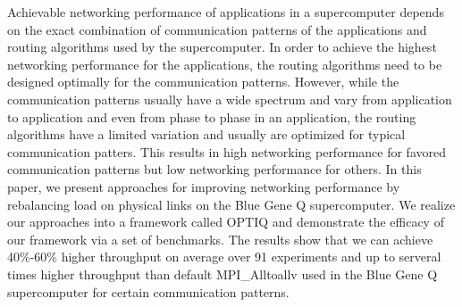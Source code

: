 Achievable networking performance of applications in a supercomputer depends on the exact combination of communication patterns of the applications and routing algorithms used by the supercomputer. In order to achieve the highest networking performance for the applications, the routing algorithms need to be designed optimally for the communication patterns. However, while the communication patterns usually have a wide spectrum and vary from application to application and even from phase to phase in an application, the routing algorithms have a limited variation and usually are optimized for typical communication patters. This results in high networking performance for favored communication patterns but low networking performance for others. In this paper, we present approaches for improving networking performance by rebalancing load on physical links on the Blue Gene Q supercomputer. We realize our approaches into a framework called OPTIQ and demonstrate the efficacy of our framework via a set of benchmarks. The results show that we can achieve 40\%-60\% higher throughput on average over 91 experiments and up to serveral times higher throughput than default MPI\_Alltoallv used in the Blue Gene Q supercomputer for certain communication patterns.

